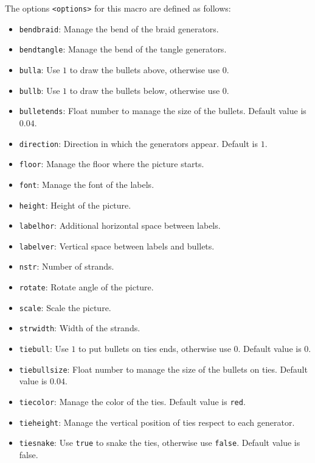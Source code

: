 \documentclass[reqno]{../../../Projects/LaTeX/gtpart}
\numberwithin{equation}{section}
\begin{document}
The options \texttt{<options>} for this macro are defined as follows:
\begin{itemize}
\item \texttt{bendbraid}: Manage the bend of the braid generators.
\item \texttt{bendtangle}: Manage the bend of the tangle generators.
\item \texttt{bulla}: Use $1$ to draw the bullets above, otherwise use $0$.
\item \texttt{bullb}: Use $1$ to draw the bullets below, otherwise use $0$.
\item \texttt{bulletends}: Float number to manage the size of the bullets. Default value is $0.04$.
\item \texttt{direction}: Direction in which the generators appear. Default is $1$.
\item \texttt{floor}: Manage the floor where the picture starts.
\item \texttt{font}: Manage the font of the labels.
\item \texttt{height}: Height of the picture.
\item \texttt{labelhor}: Additional horizontal space between labels.
\item \texttt{labelver}: Vertical space between labels and bullets.
\item \texttt{nstr}: Number of strands.
\item \texttt{rotate}: Rotate angle of the picture.
\item \texttt{scale}: Scale the picture.
\item \texttt{strwidth}: Width of the strands.
\item \texttt{tiebull}: Use $1$ to put bullets on ties ends, otherwise use $0$. Default value is $0$.
\item \texttt{tiebullsize}: Float number to manage the size of the bullets on ties. Default value is $0.04$.
\item \texttt{tiecolor}: Manage the color of the ties. Default value is \texttt{red}.
\item \texttt{tieheight}: Manage the vertical position of ties respect to each generator.
\item \texttt{tiesnake}: Use \texttt{true} to snake the ties, otherwise use \texttt{false}. Default value is false.

\end{itemize}
\end{document}
